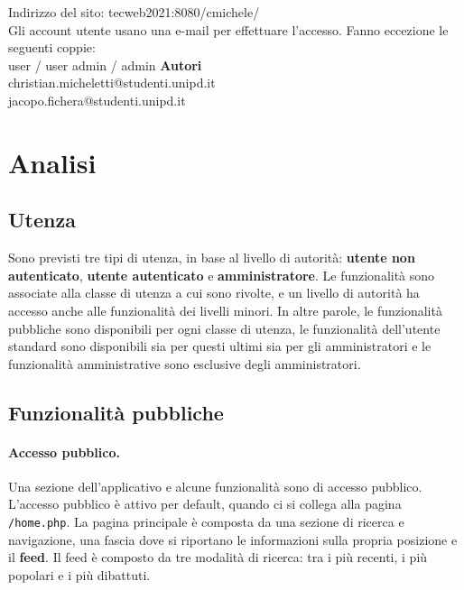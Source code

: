 \documentclass[12pt, a4paper]{article}
\begin{document}
\begin{titlepage}
\begin{center}
Indirizzo del sito: tecweb2021:8080/cmichele/ \\
Gli account utente usano una e-mail per effettuare l'accesso. Fanno eccezione le seguenti coppie: \\
user / user
admin / admin
\vfill
\textbf{Autori} \\
christian.micheletti@studenti.unipd.it \\
jacopo.fichera@studenti.unipd.it
\end{center}
\end{titlepage}

\newpage

\tableofcontents

\newpage

\section{Analisi}
\subsection{Utenza}
Sono previsti tre tipi di utenza, in base al livello di autorità: \textbf{utente non autenticato}, \textbf{utente autenticato} e \textbf{amministratore}. Le funzionalità sono associate alla classe di utenza a cui sono rivolte, e un livello di autorità ha accesso anche alle funzionalità dei livelli minori. In altre parole, le funzionalità pubbliche sono disponibili per ogni classe di utenza, le funzionalità dell'utente standard sono disponibili sia per questi ultimi sia per gli amministratori e le funzionalità amministrative sono esclusive degli amministratori.
\subsection{Funzionalità pubbliche}
\paragraph{Accesso pubblico.} Una sezione dell'applicativo e alcune funzionalità sono di accesso pubblico. L'accesso pubblico è attivo per default, quando ci si collega alla pagina \texttt{/home.php}. La pagina principale è composta da una sezione di ricerca e navigazione, una fascia dove si riportano le informazioni sulla propria posizione e il \textbf{feed}. Il feed è composto da tre modalità di ricerca: tra i più recenti, i più popolari e i più dibattuti.
\end{document}
